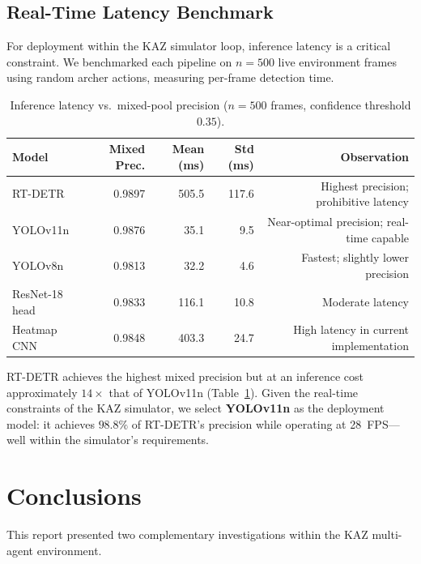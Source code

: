 \documentclass[11pt,a4paper]{article}
\begin{document}
\subsection{Real-Time Latency Benchmark}
\label{sec:realtime}

For deployment within the KAZ simulator loop, inference latency is a critical constraint. We benchmarked each pipeline on $n{=}500$ live environment frames using random archer actions, measuring per-frame detection time.

\begin{table}[H]
  \centering
  \caption{Inference latency vs.\ mixed-pool precision ($n{=}500$ frames, confidence threshold $0.35$).}
  \label{tab:realtime}
  \small
  \begin{tabular}{@{}lrrrr@{}}
    \toprule
    \textbf{Model} & \textbf{Mixed Prec.} & \textbf{Mean (ms)} & \textbf{Std (ms)} & \textbf{Observation} \\
    \midrule
    RT-DETR        & 0.9897 & 505.5 & 117.6 & Highest precision; prohibitive latency \\
    YOLOv11n       & 0.9876 & 35.1  & 9.5   & Near-optimal precision; real-time capable \\
    YOLOv8n        & 0.9813 & 32.2  & 4.6   & Fastest; slightly lower precision \\
    ResNet-18 head & 0.9833 & 116.1 & 10.8  & Moderate latency \\
    Heatmap CNN    & 0.9848 & 403.3 & 24.7  & High latency in current implementation \\
    \bottomrule
  \end{tabular}
\end{table}

RT-DETR achieves the highest mixed precision but at an inference cost approximately $14\times$ that of YOLOv11n (Table~\ref{tab:realtime}). Given the real-time constraints of the KAZ simulator, we select \textbf{YOLOv11n} as the deployment model: it achieves $98.8\%$ of RT-DETR's precision while operating at 28~FPS---well within the simulator's requirements.

\section{Conclusions}
\label{sec:conclusions}

This report presented two complementary investigations within the KAZ multi-agent environment.
\end{document}
